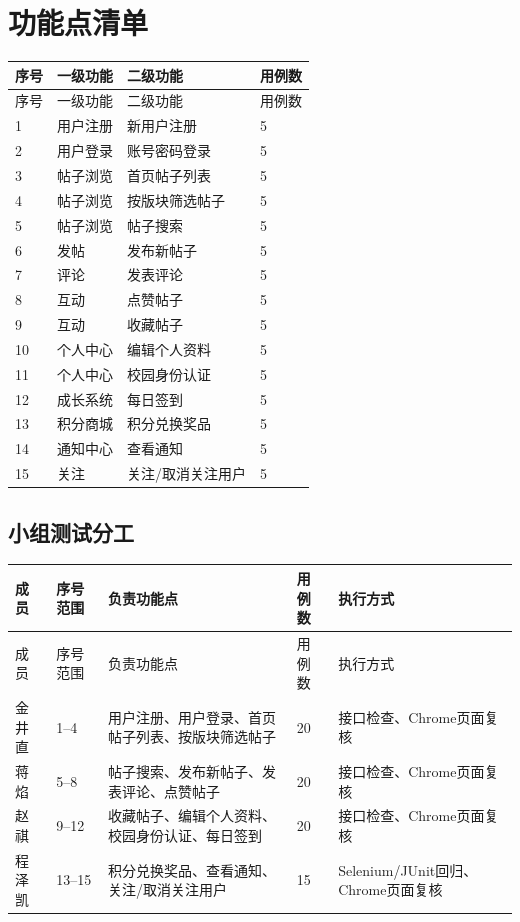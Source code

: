 \documentclass[bwprint]{report}
\begin{document}
\section{功能点清单}
\begin{longtable}{P{1cm}P{3cm}P{6cm}P{2cm}}
\toprule
序号 & 一级功能 & 二级功能 & 用例数\\
\midrule
\endfirsthead
\toprule
序号 & 一级功能 & 二级功能 & 用例数\\
\midrule
{} & 用户注册 & 新用户注册 & 5 \\
2 & 用户登录 & 账号密码登录 & 5 \\
3 & 帖子浏览 & 首页帖子列表 & 5 \\
4 & 帖子浏览 & 按版块筛选帖子 & 5 \\
5 & 帖子浏览 & 帖子搜索 & 5 \\
6 & 发帖 & 发布新帖子 & 5 \\
7 & 评论 & 发表评论 & 5 \\
8 & 互动 & 点赞帖子 & 5 \\
9 & 互动 & 收藏帖子 & 5 \\
10 & 个人中心 & 编辑个人资料 & 5 \\
11 & 个人中心 & 校园身份认证 & 5 \\
12 & 成长系统 & 每日签到 & 5 \\
13 & 积分商城 & 积分兑换奖品 & 5 \\
14 & 通知中心 & 查看通知 & 5 \\
15 & 关注 & 关注/取消关注用户 & 5 \\
\bottomrule
\end{longtable}

\subsection{小组测试分工}
\begin{longtable}{P{2.2cm}P{2.2cm}P{5.6cm}P{1.6cm}P{3.2cm}}
\toprule
成员 & 序号范围 & 负责功能点 & 用例数 & 执行方式\\
\midrule
\endfirsthead
\toprule
成员 & 序号范围 & 负责功能点 & 用例数 & 执行方式\\
\midrule
\endhead
金井直 & 1--4 & 用户注册、用户登录、首页帖子列表、按版块筛选帖子 & 20 & 接口检查、Chrome页面复核\\
蒋焰 & 5--8 & 帖子搜索、发布新帖子、发表评论、点赞帖子 & 20 & 接口检查、Chrome页面复核\\
赵祺 & 9--12 & 收藏帖子、编辑个人资料、校园身份认证、每日签到 & 20 & 接口检查、Chrome页面复核\\
程泽凯 & 13--15 & 积分兑换奖品、查看通知、关注/取消关注用户 & 15 & Selenium/JUnit回归、Chrome页面复核\\
\bottomrule
\end{longtable}
\end{document}
